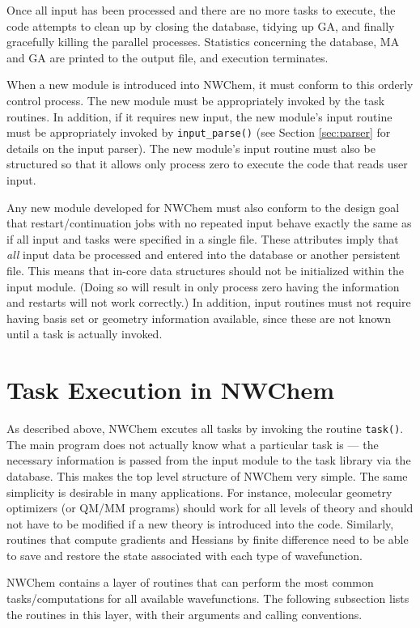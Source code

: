 Once all input has been processed and there are no more tasks to execute,
the code attempts to clean up by closing the database, 
tidying up GA, and finally gracefully killing the parallel processes.  Statistics 
concerning the database, MA and GA are printed to the output file, and execution
terminates.

When a new module is introduced into NWChem, it must conform to this
orderly control process.  The new module must be appropriately
invoked by the task routines.  In addition, if it requires new input, the new module's
input routine must be 
appropriately invoked by \verb+input_parse()+ (see Section \ref{sec:parser} for details
on the input parser).  The new module's input routine must also be structured so that
it allows only
process zero to execute the code that reads user input.  

Any new module developed for NWChem must also conform to the design 
goal that restart/continuation jobs with no repeated input behave exactly the same as 
if all input and tasks were specified in a single file.  These attributes imply that 
{\em all} input data be processed and entered into the database or another persistent 
file.  This means that in-core data structures should not be initialized
 within the input module.  (Doing so will result in
only process zero having the information and 
restarts will not work correctly.)  In addition, 
input routines must not require having basis set or geometry information 
available, since these are not known until a task is actually invoked.

\section{Task Execution in NWChem}
As described above, NWChem excutes all tasks by invoking the routine 
\verb+task()+.  The main program does not actually know 
what a particular task is --- the necessary 
information is passed from the input module to the task library via the 
database.  This makes the top level structure of NWChem very simple.  The same simplicity 
is desirable in many applications.  For instance, molecular geometry optimizers 
(or QM/MM programs) should work for all levels of theory and should not have to be 
modified if a new theory is introduced into the code.  Similarly, routines that 
compute gradients and Hessians by finite difference need to be able 
to save and restore the state associated with each type of wavefunction.

NWChem contains a layer of routines that can perform 
the most common tasks/computations for all available wavefunctions.
The following subsection lists the routines in this layer, with their arguments and
calling conventions.

